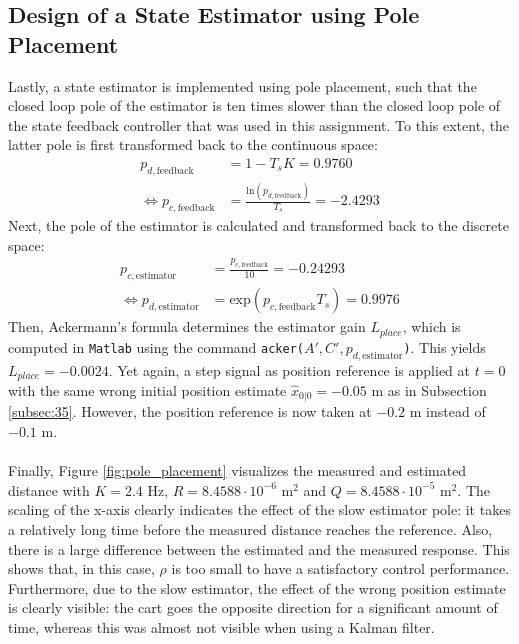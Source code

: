 \documentclass[a4paper,kul]{kulakarticle} %
\begin{document}
\subsection{Design of a State Estimator using Pole Placement}
Lastly, a state estimator is implemented using pole placement, such that the closed loop pole of the estimator is ten times slower than the closed loop pole of the state feedback controller that was used in this assignment. To this extent, the latter pole is first transformed back to the continuous space:
\begin{equation}
	\begin{split}
		p_{d, \text{feedback}} &= 1 - T_s K = 0.9760 \\
		\iff p_{c, \text{feedback}} &= \frac{\text{ln}(p_{d, \text{feedback}})}{T_s} = - 2.4293
	\end{split}
\end{equation}
Next, the pole of the estimator is calculated and transformed back to the discrete space:
\begin{equation}
	\begin{split}
		p_{c, \text{estimator}} &= \frac{p_{c, \text{feedback}}}{10} = - 0.24293 \\
		\iff p_{d, \text{estimator}} &= \text{exp}( p_{c, \text{feedback}} T_s) = 0.9976
	\end{split}
\end{equation}
Then, Ackermann's formula determines the estimator gain $L_{place}$, which is computed in \texttt{Matlab} using the command \texttt{acker($A', C', p_{d, \text{estimator}}$)}. This yields $L_{place} = -0.0024$. Yet again, a step signal as position reference is applied at $t = 0$ with the same wrong initial position estimate $\hat{x}_{0|0} = -0.05$ m as in Subsection \ref{subsec:35}. However, the position reference is now taken at $-0.2$ m instead of $-0.1$ m.
\\\\
Finally, Figure \ref{fig:pole_placement} visualizes the measured and estimated distance with $K = 2.4$ Hz, $R = 8.4588\cdot10^{-6}$  m$^2$ and $Q = 8.4588\cdot10^{-5}$  m$^2$. The scaling of the x-axis clearly indicates the effect of the slow estimator pole: it takes a relatively long time before the measured distance reaches the reference. Also, there is a large difference between the estimated and the measured response. This shows that, in this case, $\rho$ is too small to have a satisfactory control performance. Furthermore, due to the slow estimator, the effect of the wrong position estimate is clearly visible: the cart goes the opposite direction for a significant amount of time, whereas this was almost not visible when using a Kalman filter.
\end{document}
